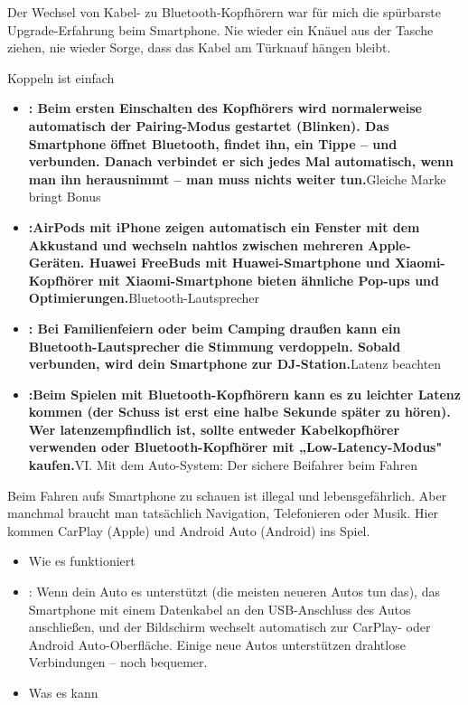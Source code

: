 
Der Wechsel von Kabel- zu Bluetooth-Kopfhörern war für mich die spürbarste Upgrade-Erfahrung beim Smartphone. Nie wieder ein Knäuel aus der Tasche ziehen, nie wieder Sorge, dass das Kabel am Türknauf hängen bleibt.

Koppeln ist einfach

\begin{itemize}
  \item \textbf{: Beim ersten Einschalten des Kopfhörers wird normalerweise automatisch der Pairing-Modus gestartet (Blinken). Das Smartphone öffnet Bluetooth, findet ihn, ein Tippe – und verbunden. Danach verbindet er sich jedes Mal automatisch, wenn man ihn herausnimmt – man muss nichts weiter tun.}Gleiche Marke bringt Bonus
  \item \textbf{:AirPods mit iPhone zeigen automatisch ein Fenster mit dem Akkustand und wechseln nahtlos zwischen mehreren Apple-Geräten. Huawei FreeBuds mit Huawei-Smartphone und Xiaomi-Kopfhörer mit Xiaomi-Smartphone bieten ähnliche Pop-ups und Optimierungen.}Bluetooth-Lautsprecher
  \item \textbf{: Bei Familienfeiern oder beim Camping draußen kann ein Bluetooth-Lautsprecher die Stimmung verdoppeln. Sobald verbunden, wird dein Smartphone zur DJ-Station.}Latenz beachten
  \item \textbf{:Beim Spielen mit Bluetooth-Kopfhörern kann es zu leichter Latenz kommen (der Schuss ist erst eine halbe Sekunde später zu hören). Wer latenzempfindlich ist, sollte entweder Kabelkopfhörer verwenden oder Bluetooth-Kopfhörer mit „Low-Latency-Modus" kaufen.}VI. Mit dem Auto-System: Der sichere Beifahrer beim Fahren
\end{itemize}

Beim Fahren aufs Smartphone zu schauen ist illegal und lebensgefährlich. Aber manchmal braucht man tatsächlich Navigation, Telefonieren oder Musik. Hier kommen CarPlay (Apple) und Android Auto (Android) ins Spiel.

\begin{itemize}
  \item Wie es funktioniert
  \item : Wenn dein Auto es unterstützt (die meisten neueren Autos tun das), das Smartphone mit einem Datenkabel an den USB-Anschluss des Autos anschließen, und der Bildschirm wechselt automatisch zur CarPlay- oder Android Auto-Oberfläche. Einige neue Autos unterstützen drahtlose Verbindungen – noch bequemer.
  \item Was es kann
\end{itemize}

